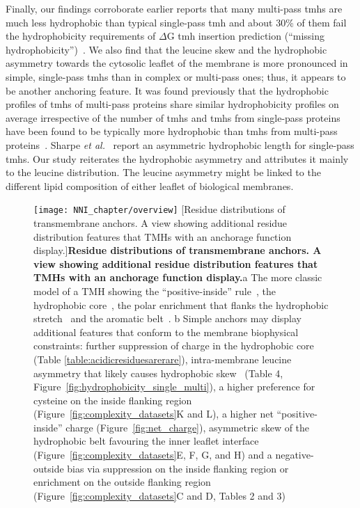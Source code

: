 Finally, our findings corroborate earlier reports that many multi-pass \gls{tmh}s are much less hydrophobic than typical single-pass \gls{tmh} and about 30\% of them fail the hydrophobicity requirements of $\Delta$G \gls{tmh} insertion prediction (``missing hydrophobicity'')~\cite{Hessa2005, Hedin2010, Hessa2007, Ojemalm2012}.
We also find that the leucine skew and the hydrophobic asymmetry towards the cytosolic leaflet of the membrane is more pronounced in simple, single-pass \gls{tmh}s than in complex or multi-pass ones; thus, it appears to be another anchoring feature.
It was found previously that the hydrophobic profiles of \gls{tmh}s of multi-pass proteins share similar hydrophobicity profiles on average irrespective of the number of \gls{tmh}s and \gls{tmh}s from single-pass proteins have been found to be typically more hydrophobic than \gls{tmh}s from multi-pass proteins~\cite{Wong2011}.
Sharpe \textit{et al.}~\cite{Sharpe2010} report an asymmetric hydrophobic length for single-pass \gls{tmh}s.
Our study reiterates the hydrophobic asymmetry and attributes it mainly to the leucine distribution.
The leucine asymmetry might be linked to the different lipid composition of either leaflet of biological membranes.

\begin{figure}[!ht]
\centering
\texttt{[image: NNI\_chapter/overview]}
[Residue distributions of transmembrane anchors.
A view showing additional residue distribution features that TMHs with an anchorage function display.]{\textbf{Residue distributions of transmembrane anchors.
A view showing additional residue distribution features that TMHs with an anchorage function display.}a The more classic model of a TMH showing the ``positive-inside'' rule~\cite{VonHeijne1989}, the hydrophobic core~\cite{Kyte1982}, the polar enrichment that flanks the hydrophobic stretch~\cite{Baeza-Delgado2013} and the aromatic belt~\cite{Granseth2005}.
b Simple anchors may display additional features that conform to the membrane biophysical constraints: further suppression of charge in the hydrophobic core (Table \ref{table:acidicresiduesarerare}), intra-membrane leucine asymmetry that likely causes hydrophobic skew~\cite{Sharpe2010} (Table 4, Figure~\ref{fig:hydrophobicity_single_multi}), a higher preference for cysteine on the inside flanking region (Figure~\ref{fig:complexity_datasets}K and L), a higher net ``positive-inside'' charge (Figure~\ref{fig:net_charge}), asymmetric skew of the hydrophobic belt favouring the inner leaflet interface (Figure~\ref{fig:complexity_datasets}E, F, G, and H) and a negative-outside bias via suppression on the inside flanking region or enrichment on the outside flanking region (Figure~\ref{fig:complexity_datasets}C and D, Tables 2 and 3)}

\label{fig:overview}
\end{figure}

